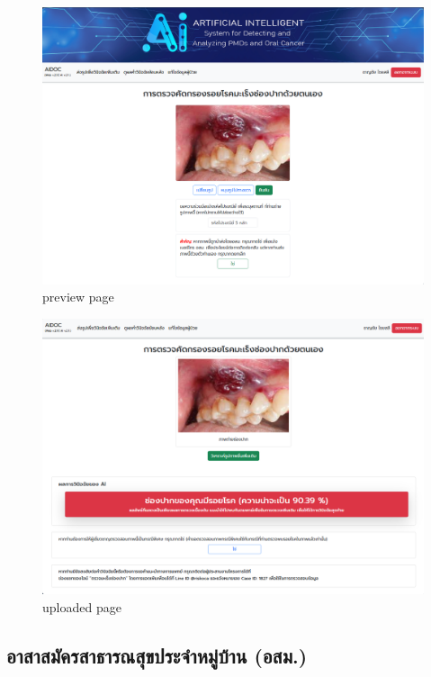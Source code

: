   \begin{figure}[H]
    \centering
    \graphicspath{{./images/}}
    \includegraphics[scale=0.3]{preview_patient.png}
    \caption{preview page}
    \label{fig:preview_patient}
  \end{figure}
    \begin{figure}[H]
      \centering
      \graphicspath{{./images/}}
      \includegraphics[scale=0.3]{upload_complete_patient.png}
      \caption{uploaded page}
      \label{fig:upload_complete_patient}
    \end{figure}

\subsection{อาสาสมัครสาธารณสุขประจําหมู่บ้าน (อสม.)}
